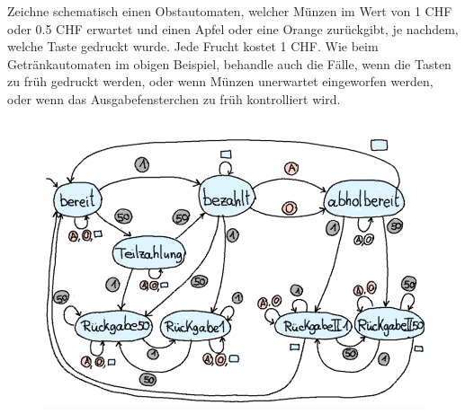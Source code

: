 %
%
Zeichne schematisch einen Obstautomaten, welcher Münzen im Wert von 1 CHF oder 0.5 CHF erwartet und einen Apfel oder eine Orange zurückgibt, je nachdem, welche Taste gedruckt wurde. Jede Frucht kostet 1 CHF. Wie beim Getränkautomaten im obigen Beispiel, behandle auch die Fälle, wenn die Tasten zu früh gedruckt werden, oder wenn Münzen unerwartet eingeworfen werden, oder wenn das Ausgabefensterchen zu früh kontrolliert wird.
\begin{figure}[H]
\centering
\includegraphics[width=0.6\linewidth]{Pictures/Obstautomat.png}
\end{figure}
